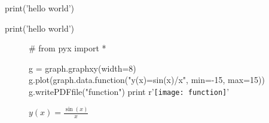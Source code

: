 \documentclass{article}
\begin{document}
\begin{pythoncode}
print('hello world')
\end{pythoncode}
\begin{python}
print('hello world')
\end{python}


\begin{figure}
\centering
\begin{python}
#
from pyx import *

g = graph.graphxy(width=8)
g.plot(graph.data.function("y(x)=sin(x)/x", min=-15, max=15))
g.writePDFfile("function")
print r'\texttt{[image: function]}'
\end{python}
\caption{$y(x)=\frac{\sin(x)}{x}$}
\end{figure}
\end{document}
